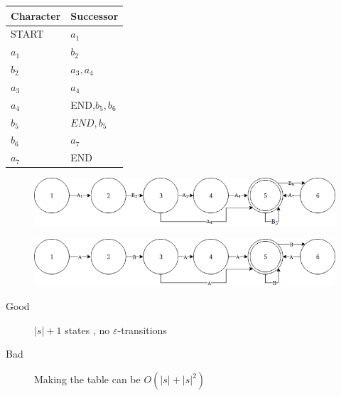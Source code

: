 \begin{table}[H]
\centering
\begin{tabular}{|l|l|}
\hline
Character & Successor \\ \hline
START & $a_1$ \\ \hline
$a_1$ & $b_2$ \\ \hline
$b_2$ & $a_3, a_4$ \\ \hline
$a_3$ & $a_4$ \\ \hline
$a_4$ & END,$ b_5, b_6$ \\ \hline
$b_5$ & $END,b_5$ \\ \hline
$b_6$ & $a_7$ \\ \hline
$a_7$ & END \\ \hline
\end{tabular}
\label{tab:Regex2.23}
\end{table}
\begin{figure}[H]
    \centering
    \includegraphics[width=\textwidth]{Regex/Regex24.png}
    \label{fig:Regex2.4}
\end{figure}
\begin{figure}[H]
    \centering
    \includegraphics[width=\textwidth]{Regex/Regex25.png}
    \label{fig:Regex2.5}
\end{figure}
\begin{description}
    \item[Good] $|s|+1$ states , no $\varepsilon$-transitions
    \item[Bad] Making the table can be $O(|s| + |s|^2)$
\end{description}